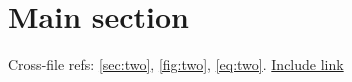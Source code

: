 \documentclass{article}
\begin{document}
\section{Main section}
\label{sec:main}



Cross-file refs: \ref{sec:two}, \ref{fig:two}, \ref{eq:two}.
\href{https://example.com/include}{Include link}
\end{document}
